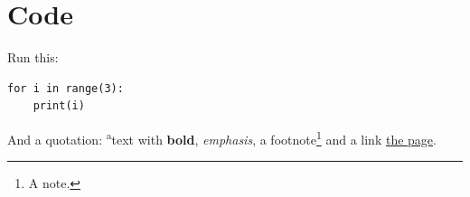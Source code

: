 \documentclass{article}
\begin{document}
\section{Code}
Run this:
\begin{verbatim}
for i in range(3):
    print(i)
\end{verbatim}
And a quotation: \textsuperscript{a}text with \textbf{bold}, \emph{emphasis}, a footnote\footnote{A note.}
and a link \href{https://example.org/page}{the page}.
\end{document}
